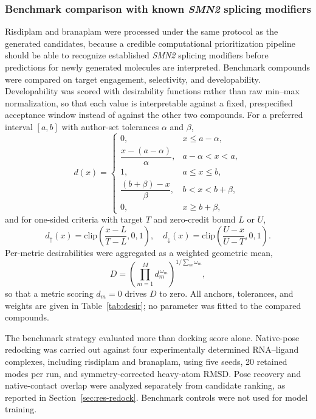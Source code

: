 \documentclass[journal]{IEEEtran}
\begin{document}
\subsubsection{Benchmark comparison with known \textit{SMN2} splicing
modifiers}
Risdiplam and branaplam were processed under the same protocol as the
generated candidates, because a credible computational prioritization
pipeline should be able to recognize established \textit{SMN2} splicing
modifiers before predictions for newly generated molecules are
interpreted. Benchmark compounds were compared on target engagement,
selectivity, and developability. Developability was scored with
desirability functions rather than raw min--max normalization, so that
each value is interpretable against a fixed, prespecified acceptance
window instead of against the other two compounds. For a preferred
interval $[a,b]$ with author-set tolerances $\alpha$ and $\beta$,
\begin{equation}
d(x) =
\begin{cases}
0, & x \le a-\alpha,\\[2pt]
\dfrac{x-(a-\alpha)}{\alpha}, & a-\alpha < x < a,\\[6pt]
1, & a \le x \le b,\\[2pt]
\dfrac{(b+\beta)-x}{\beta}, & b < x < b+\beta,\\[6pt]
0, & x \ge b+\beta,
\end{cases}
\label{eq:desirrange}
\end{equation}
and for one-sided criteria with target $T$ and zero-credit bound $L$ or
$U$,
\begin{equation}
d_{\uparrow}(x) = \mathrm{clip}\!\left(\frac{x-L}{T-L},0,1\right),
\quad
d_{\downarrow}(x) = \mathrm{clip}\!\left(\frac{U-x}{U-T},0,1\right).
\label{eq:desironesided}
\end{equation}
Per-metric desirabilities were aggregated as a weighted geometric mean,
\begin{equation}
D = \left(\prod_{m=1}^{M} d_{m}^{\,\omega_{m}}\right)^{1/\sum_{m}\omega_{m}},
\label{eq:geomean}
\end{equation}
so that a metric scoring $d_{m} = 0$ drives $D$ to zero. All anchors,
tolerances, and weights are given in Table~\ref{tab:desir}; no parameter
was fitted to the compared compounds.

The benchmark strategy evaluated more than docking score alone.
Native-pose redocking was carried out against four experimentally
determined RNA--ligand complexes, including risdiplam and branaplam,
using five seeds, 20 retained modes per run, and symmetry-corrected
heavy-atom RMSD. Pose recovery and native-contact overlap were analyzed
separately from candidate ranking, as reported in
Section~\ref{sec:res-redock}. Benchmark controls were not used for model
training.
\end{document}
